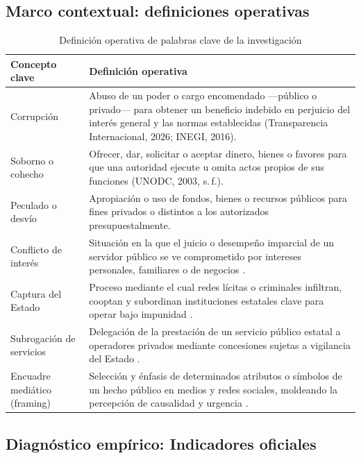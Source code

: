 \documentclass[12pt,letterpaper,oneside]{article}
\begin{document}
\subsection{Marco contextual: definiciones operativas}

\begin{table}[H]
\centering
\caption{Definición operativa de palabras clave de la investigación}
\label{tab:definiciones}
\small
\begin{tabular}{@{}p{3.5cm}p{10cm}@{}}
\toprule
\textbf{Concepto clave} & \textbf{Definición operativa} \\
\midrule
Corrupción & Abuso de un poder o cargo encomendado ---público o privado--- para obtener un beneficio indebido en perjuicio del interés general y las normas establecidas (Transparencia Internacional, 2026; INEGI, 2016). \\
\addlinespace
Soborno o cohecho & Ofrecer, dar, solicitar o aceptar dinero, bienes o favores para que una autoridad ejecute u omita actos propios de sus funciones (UNODC, 2003, s.\,f.). \\
\addlinespace
Peculado o desvío & Apropiación o uso de fondos, bienes o recursos públicos para fines privados o distintos a los autorizados presupuestalmente. \\
\addlinespace
Conflicto de interés & Situación en la que el juicio o desempeño imparcial de un servidor público se ve comprometido por intereses personales, familiares o de negocios \citep{lomnitz2000}. \\
\addlinespace
Captura del Estado & Proceso mediante el cual redes lícitas o criminales infiltran, cooptan y subordinan instituciones estatales clave para operar bajo impunidad \citep{merino2024,vazquezvalencia2019}. \\
\addlinespace
Subrogación de servicios & Delegación de la prestación de un servicio público estatal a operadores privados mediante concesiones sujetas a vigilancia del Estado \citep{leal2010,sernadelagarza2010}. \\
\addlinespace
Encuadre mediático (framing) & Selección y énfasis de determinados atributos o símbolos de un hecho público en medios y redes sociales, moldeando la percepción de causalidad y urgencia \citep{solamorales2019}. \\
\bottomrule
\end{tabular}
\end{table}

\subsection{Diagnóstico empírico: Indicadores oficiales}
\end{document}
